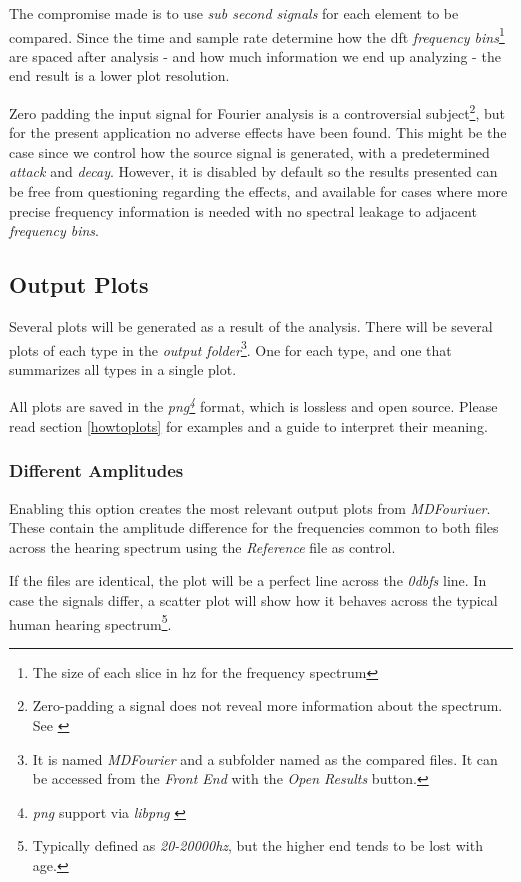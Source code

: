 \documentclass[10pt,a4paper]{report}
\newcommand{\defineCite}[2]{\textit{\acrshort{#1}\footnote{\textit{\acrlong{#1}} #2}}}
\newcommand{\fhz}[1]{\textit{#1\acrshort{hz}}}
\newcommand{\db}[1]{\textit{#1\acrshort{dbfs}}}
\begin{document}
\begin{appendices}
The compromise made is to use \textit{sub second signals} for each element to be compared. Since the time and sample rate determine how the \acrshort{dft} \textit{frequency bins}\footnote{The size of each slice in \acrlong{hz} for the frequency spectrum} are spaced after analysis - and how much information we end up analyzing - the end result is a lower plot resolution.

Zero padding the input signal for Fourier analysis is a controversial subject\footnote{Zero-padding a signal does not reveal more information about the spectrum. See \cite{zeropaddinginterpolate} \cite{ZeroPaddingBad}}, but for the present application no adverse effects have been found. This might be the case since we control how the source signal is generated, with a predetermined \textit{attack} and \textit{decay}. However, it is disabled by default so the results presented can be free from questioning regarding the effects, and available for cases where more precise frequency information is needed with no spectral leakage to adjacent \textit{frequency bins}.

\subsection{Output Plots}
\label{outputfiles}

Several plots will be generated as a result of the analysis. There will be several plots of each type in the \textit{output folder}\footnote{It is named \textit{MDFourier} and a subfolder named as the compared files. It can be accessed from the \textit{Front End} with the \textit{Open Results} button.}. One for each type, and one that summarizes all types in a single plot.

All plots are saved in the \defineCite{png}{support via \textit{libpng} \cite{libpng}} format, which is lossless and open source. Please read section \ref{howtoplots} for examples and a guide to interpret their meaning. 

\subsubsection{Different Amplitudes}

Enabling this option creates the most relevant output plots from \textit{MDFouriuer}. These contain the amplitude difference for the frequencies common to both files across the hearing spectrum using the \textit{Reference} file as control.

If the files are identical, the plot will be a perfect line across the \db{0} line. In case the signals differ, a scatter plot will show how it behaves across the typical human hearing spectrum\footnote{Typically defined as \fhz{20-20000}, but the higher end tends to be lost with age.}.


\end{appendices}
\end{document}
